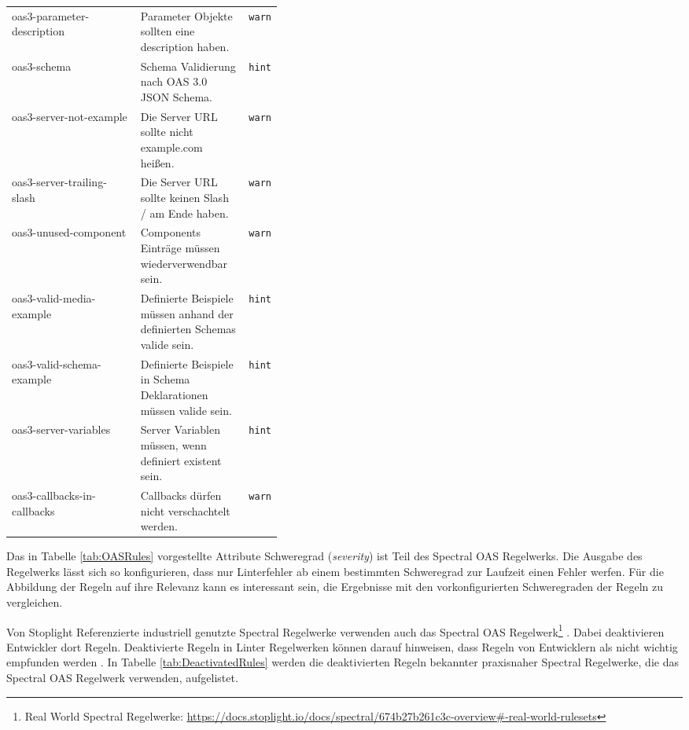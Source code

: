 {\begin{longtable}{lp{0.4\linewidth}r}
    oas3-parameter-description & Parameter Objekte sollten eine description haben. & \texttt{warn}\\
    oas3-schema & Schema Validierung nach OAS 3.0 JSON Schema. & \texttt{hint}\\
    oas3-server-not-example & Die Server \acs{URL} sollte nicht example.com heißen. & \texttt{warn} \\
    oas3-server-trailing-slash & Die Server \acs{URL} sollte keinen Slash / am Ende haben. & \texttt{warn}\\
    oas3-unused-component & Components Einträge müssen wiederverwendbar sein. & \texttt{warn}\\
    oas3-valid-media-example & Definierte Beispiele müssen anhand der definierten Schemas valide sein. & \texttt{hint}\\
    oas3-valid-schema-example & Definierte Beispiele in Schema Deklarationen müssen valide sein. & \texttt{hint}\\
    oas3-server-variables & Server Variablen müssen, wenn definiert existent sein. & \texttt{hint}\\
    oas3-callbacks-in-callbacks & Callbacks dürfen nicht verschachtelt werden. & \texttt{warn}\\ \hline\hline
  \end{longtable}
}

Das in Tabelle \ref{tab:OASRules} vorgestellte Attribute Schweregrad (\textit{severity}) ist Teil des Spectral \acs{OAS} Regelwerks. Die Ausgabe des Regelwerks lässt sich so konfigurieren, dass nur Linterfehler ab einem bestimmten Schweregrad zur Laufzeit einen Fehler werfen. Für die Abbildung der Regeln auf ihre Relevanz kann es interessant sein, die Ergebnisse mit den vorkonfigurierten Schweregraden der Regeln zu vergleichen.

Von Stoplight Referenzierte industriell genutzte Spectral Regelwerke verwenden auch das Spectral \acs{OAS} Regelwerk\footnote{Real World Spectral Regelwerke: \href{https://docs.stoplight.io/docs/spectral/674b27b261c3c-overview\#-real-world-rulesets}{https://docs.stoplight.io/docs/spectral/674b27b261c3c-overview\#-real-world-rulesets}} \parencite{stoplight_spectral_2024-2}. Dabei deaktivieren Entwickler dort Regeln. Deaktivierte Regeln in Linter Regelwerken können darauf hinweisen, dass Regeln von Entwicklern als nicht wichtig empfunden werden \parencite{tomasdottir_adoption_2018}. In Tabelle \ref{tab:DeactivatedRules} werden die deaktivierten Regeln bekannter praxisnaher Spectral Regelwerke, die das Spectral \acs{OAS} Regelwerk verwenden, aufgelistet.

